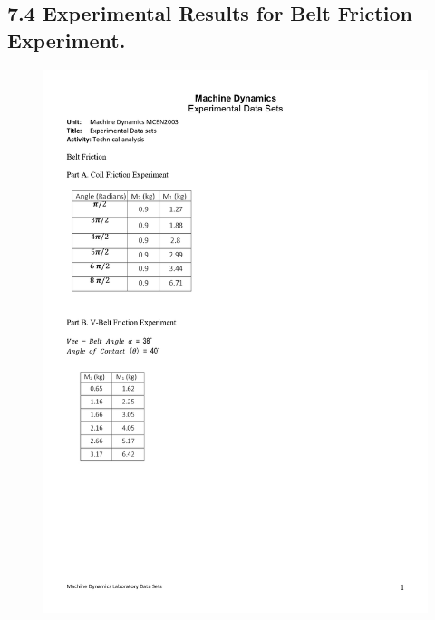 \documentclass[12pt,a4paper]{report}
\begin{document}
\subsection*{7.4  Experimental Results for Belt Friction Experiment.}
\begin{figure}[H]
  \includegraphics[width=\linewidth]{dataset/belt}
  \caption*{}
\label{}
\end{figure}
\end{document}

